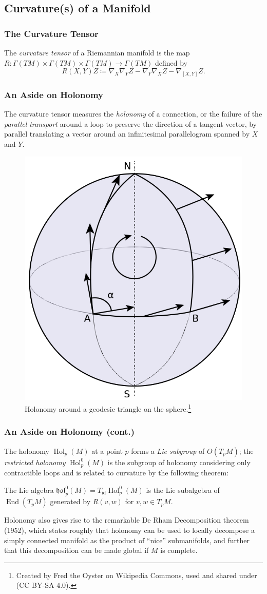 \documentclass{beamer}
\DeclareMathOperator{\End}{End}
\DeclareMathOperator{\id}{id}
\DeclareMathOperator{\Hol}{Hol}
\theoremstyle{definition}
\begin{document}
\subsection{Curvature(s) of a Manifold}

\begin{frame}
    \frametitle{The Curvature Tensor}

    \begin{definition}
        The \emph{curvature tensor} of a Riemannian manifold is the map
        $R : \Gamma(TM) \times \Gamma(TM) \times \Gamma(TM) \to \Gamma(TM)$
        defined by
        \[
          R(X,Y)Z \coloneqq \nabla_X\nabla_YZ - \nabla_Y\nabla_XZ - \nabla_{[X,Y]}Z.  
        \]
    \end{definition}
\end{frame}

\begin{frame}
    \frametitle{An Aside on Holonomy}

    The curvature tensor measures the \emph{holonomy} of a connection,
    or the failure of the \emph{parallel transport} around a loop to preserve
    the direction of a tangent vector, by parallel translating a vector around
    an infinitesimal parallelogram spanned by $X$ and $Y$.
    \begin{figure}
        \centering
        \includegraphics[width=.25\textwidth]{images/Parallel_Transport.svg.png}
        \caption{Holonomy around a geodesic triangle on the sphere.\footnote{Created
        by Fred the Oyster on Wikipedia Commons, used and shared under (CC BY-SA 4.0).}}
    \end{figure}
\end{frame}

\begin{frame}
    \frametitle{An Aside on Holonomy (cont.)}

    The holonomy $\Hol_p(M)$ at a point $p$ forms a \emph{Lie subgroup} of $O(T_pM)$;
    the \emph{restricted holonomy} $\Hol_p^0(M)$ is the subgroup of holonomy considering
    only contractible loops and is related to curvature by the following theorem:
    \begin{theorem}
        The Lie algebra $\mathfrak{hol}_p^0(M) = T_{\id}\Hol_p^0(M)$ is the Lie subalgebra
        of $\End(T_pM)$ generated by $R(v,w)$ for $v, w \in T_pM$.
    \end{theorem}

    Holonomy also gives rise to the remarkable De Rham Decomposition theorem (1952),
    which states roughly that holonomy can be used to locally decompose a simply
    connected manifold as the product of ``nice'' submanifolds, and further that
    this decomposition can be made global if $M$ is complete.
\end{frame}
\end{document}
